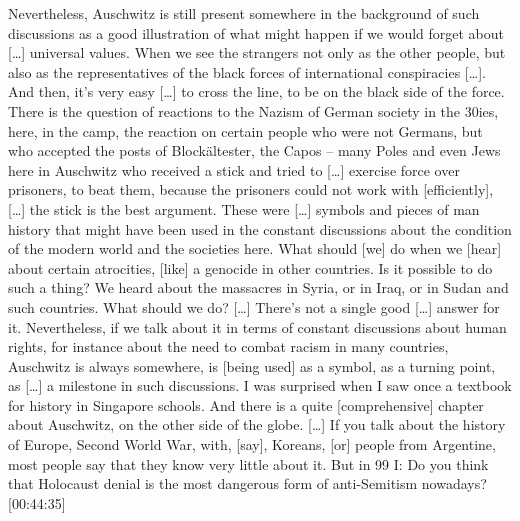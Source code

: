 Nevertheless, Auschwitz is still present somewhere in the background of such discussions as a good illustration of what might happen if we would forget about […] universal values. When we see the strangers not only as the other people, but also as the representatives of the black forces of international conspiracies […]. And then, it’s very easy […] to cross the line, to be on the black side of the force. There is the question of reactions to the Nazism of German society in the 30ies, here, in the camp, the reaction on certain people who were not Germans, but who accepted the posts of Blockältester, the Capos – many Poles and even Jews here in Auschwitz who received a stick and tried to […] exercise force over prisoners, to beat them, because the prisoners could not work with [efficiently], […] the stick is the best argument. These were […] symbols and pieces of man history that might have been used in the constant discussions about the condition of the modern world and the societies here. What should [we] do when we [hear] about certain atrocities, [like] a genocide in other countries. Is it possible to do such a thing? We heard about the massacres in Syria, or in Iraq, or in Sudan and such countries. What should we do? […] There’s not a single good […] answer for it. Nevertheless, if we talk about it in terms of constant discussions about human rights, for instance about the need to combat racism in many countries, Auschwitz is always somewhere, is [being used] as a symbol, as a turning point, as […] a milestone in such discussions. I was surprised when I saw once a textbook for history in Singapore schools. And there is a quite [comprehensive] chapter about Auschwitz, on the other side of the globe. […] If you talk about the history of Europe, Second World War, with, [say], Koreans, [or] people from Argentine, most people say that they know very little about it. But in 99%
I: Do you think that Holocaust denial is the most dangerous form of anti-Semitism nowadays? [00:44:35]
